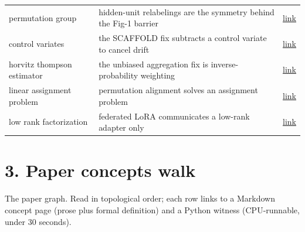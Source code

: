 \documentclass[11pt]{article}
\begin{document}
\begin{longtable}{p{} p{} p{}}
permutation group & hidden-unit relabelings are the symmetry behind the Fig-1 barrier & \href{https://github.com/pleyva2004/math-foundations/blob/main/concepts/permutation-group.md}{link} \\
control variates & the SCAFFOLD fix subtracts a control variate to cancel drift & \href{https://github.com/pleyva2004/math-foundations/blob/main/concepts/control-variates.md}{link} \\
horvitz thompson estimator & the unbiased aggregation fix is inverse-probability weighting & \href{https://github.com/pleyva2004/math-foundations/blob/main/concepts/horvitz-thompson-estimator.md}{link} \\
linear assignment problem & permutation alignment solves an assignment problem & \href{https://github.com/pleyva2004/math-foundations/blob/main/concepts/linear-assignment-problem.md}{link} \\
low rank factorization & federated LoRA communicates a low-rank adapter only & \href{https://github.com/pleyva2004/math-foundations/blob/main/concepts/low-rank-factorization.md}{link} \\
\end{longtable}

\section*{3. Paper concepts walk}

The paper graph. Read in topological order; each row links to a Markdown concept page (prose plus formal definition) and a Python witness (CPU-runnable, under 30 seconds).
\end{document}
